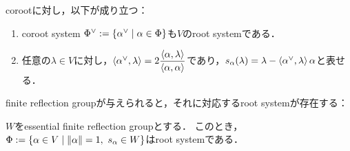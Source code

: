 \begin{proposition}
  corootに対し，以下が成り立つ：
  \begin{enumerate}[label=(\arabic*)]
    \item coroot system $\Phi^\vee := \left\lbrace \alpha^\vee \mathrel{} \middle| \mathrel{} \alpha \in \Phi \right\rbrace$も$V$のroot systemである．
    \item 任意の$\lambda \in V$に対し，$\left\langle \alpha^\vee, \lambda \right\rangle = 2 \dfrac{\left\langle \alpha, \lambda \right\rangle}{\left\langle \alpha, \alpha \right\rangle}$であり，$s_\alpha(\lambda) = \lambda - \left\langle \alpha^\vee, \lambda \right\rangle\alpha$と表せる．
  \end{enumerate}
\end{proposition}

finite reflection groupが与えられると，それに対応するroot systemが存在する：
\begin{proposition}
  \label{prop:frg_to_root}
  $W$をessential finite reflection groupとする．
  このとき，$\Phi := \set{\alpha \in V}{\norm{\alpha} = 1,\ s_\alpha \in W}$はroot systemである．
\end{proposition}

